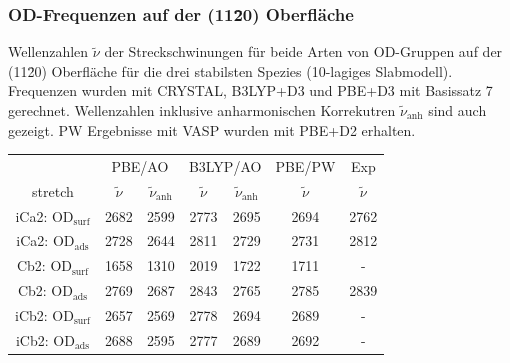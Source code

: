 \documentclass[hyperref={pdfpagelabels=false}]{beamer}
\begin{document}
\begin{frame}[noframenumbering]
\frametitle{OD-Frequenzen auf der (11\=20) Oberfläche}
Wellenzahlen $\tilde{\nu}$ der Streckschwinungen für beide Arten von OD-Gruppen auf der (11\=20) Oberfläche für die drei stabilsten Spezies (10-lagiges Slabmodell).
Frequenzen wurden mit CRYSTAL, B3LYP+D3 und PBE+D3 mit Basissatz 7 gerechnet. Wellenzahlen inklusive anharmonischen Korrekutren $\tilde{\nu}_\textrm{anh}$ sind auch gezeigt.
PW Ergebnisse mit VASP wurden mit PBE+D2 erhalten.
\begin{table}[!h]
  \centering
  \begin{tabular}{ccc|cc|c|c}
  \toprule
   & \multicolumn{2}{c}{PBE/AO} & \multicolumn{2}{c}{B3LYP/AO} &PBE/PW&Exp\\
  stretch & $\tilde{\nu}$ &$\tilde{\nu}_\textrm{anh}$ &$\tilde{\nu}$ & $\tilde{\nu}_\textrm{anh}$ &$\tilde{\nu}$ &$\tilde{\nu}$ \\\midrule
  iCa2: OD$_{\textrm{surf}}$ &2682 &2599 &2773 &2695 & 2694&2762\\
  iCa2: OD$_{\textrm{ads}}$  &2728 &2644 &2811 &2729 & 2731&2812\\
  Cb2: OD$_{\textrm{surf}}$  &1658 &1310 &2019 &1722 & 1711&-\\
  Cb2: OD$_{\textrm{ads}}$   &2769 &2687 &2843 &2765 & 2785&2839\\
  iCb2: OD$_{\textrm{surf}}$ &2657 &2569 &2778 &2694 & 2689&-\\
  iCb2: OD$_{\textrm{ads}}$  &2688 &2595 &2777 &2689 & 2692&-\\\bottomrule
  \end{tabular}
\end{table}
\end{frame}
\end{document}
